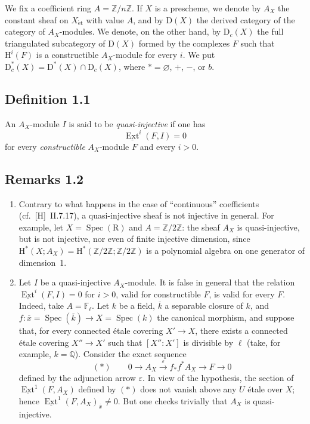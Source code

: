 \documentclass[11pt]{article}
\renewcommand{\H}{\mathrm{H}}
\DeclareMathOperator{\Ext}{Ext}
\DeclareMathOperator{\Spec}{Spec}
\newcommand{\R}{\mathrm{R}}
\newcommand{\D}{\mathrm{D}}
\newcommand{\Z}{\mathbb{Z}}
\newcommand{\F}{\mathbb{F}}
\newcommand{\Q}{\mathbb{Q}}
\newcommand{\ol}[1]{\overline{#1}}
\providecommand{\R}{\mathrm R}
\providecommand{\Z}{\mathbb Z}
\providecommand{\Spec}{\operatorname{Spec}}
\providecommand{\Spec}{\operatorname{Spec}}
\providecommand{\Spec}{\operatorname{Spec}}
\providecommand{\Spec}{\operatorname{Spec}}
\begin{document}
We fix a coefficient ring $A = \Z/n\Z$. If $X$ is a prescheme, we denote by $A_X$ the constant sheaf on $X_{\mathrm{\acute{e}t}}$ with value $A$, and by $\D(X)$ the derived category of the category of $A_X$-modules. We denote, on the other hand, by $\D_c(X)$ the full triangulated subcategory of $\D(X)$ formed by the complexes $F$ such that $\H^i(F)$ is a constructible $A_X$-module for every $i$. We put $\D_c^{*}(X) = \D^{*}(X) \cap \D_c(X)$, where $* = \varnothing$, $+$, $-$, or $b$.

\subsection*{Definition 1.1}
An $A_X$-module $I$ is said to be \emph{quasi-injective} if one has
\[
\underline{\Ext}^i(F,I) = 0
\]
for every \emph{constructible} $A_X$-module $F$ and every $i > 0$.

\subsection*{Remarks 1.2}
\begin{enumerate}[label=\alph*)]
\item Contrary to what happens in the case of ``continuous'' coefficients (cf.~[H]~II.7.17), a quasi-injective sheaf is not injective in general. For example, let $X = \Spec(\R)$ and $A = \Z/2\Z$: the sheaf $A_X$ is quasi-injective, but is not injective, nor even of finite injective dimension, since $\H^{*}(X; A_X) = \H^{*}(\Z/2\Z; \Z/2\Z)$ is a polynomial algebra on one generator of dimension~1.

\item Let $I$ be a quasi-injective $A_X$-module. It is false in general that the relation $\underline{\Ext}^i(F,I) = 0$ for $i > 0$, valid for constructible $F$, is valid for every $F$. Indeed, take $A = \F_{\ell}$. Let $k$ be a field, $\ol{k}$ a separable closure of $k$, and $f : \ol{x} = \Spec(\ol{k}) \to X = \Spec(k)$ the canonical morphism, and suppose that, for every connected étale covering $X' \to X$, there exists a connected étale covering $X'' \to X'$ such that $[X'':X']$ is divisible by $\ell$ (take, for example, $k = \Q$). Consider the exact sequence
\[
(*) \qquad 0 \longrightarrow A_X \xrightarrow{\;\varepsilon\;} f_{*}f^{*}A_X \longrightarrow F \longrightarrow 0
\]
defined by the adjunction arrow $\varepsilon$. In view of the hypothesis, the section of $\underline{\Ext}^1(F,A_X)$ defined by $(*)$ does not vanish above any $U$ étale over $X$; hence $\underline{\Ext}^1(F,A_X)_{\ol{x}} \neq 0$. But one checks trivially that $A_X$ is quasi-injective.
\end{enumerate}
\end{document}
